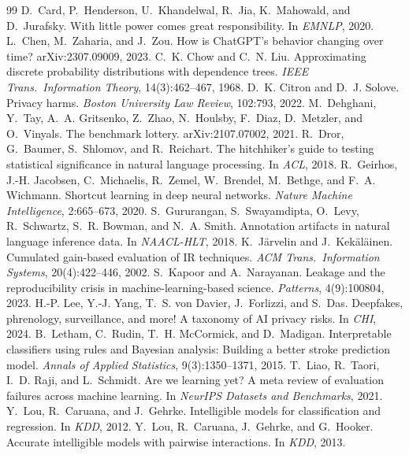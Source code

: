 \documentclass[10pt,twocolumn]{article}
\begin{document}
\begin{thebibliography}{99}\small
{} D.~Card, P.~Henderson, U.~Khandelwal, R.~Jia, K.~Mahowald, and D.~Jurafsky. With little power comes great responsibility. In \emph{EMNLP}, 2020.
 L.~Chen, M.~Zaharia, and J.~Zou. How is ChatGPT's behavior changing over time? arXiv:2307.09009, 2023.
 C.~K. Chow and C.~N. Liu. Approximating discrete probability distributions with dependence trees. \emph{IEEE Trans.\ Information Theory}, 14(3):462--467, 1968.
 D.~K. Citron and D.~J. Solove. Privacy harms. \emph{Boston University Law Review}, 102:793, 2022.
 M.~Dehghani, Y.~Tay, A.~A. Gritsenko, Z.~Zhao, N.~Houlsby, F.~Diaz, D.~Metzler, and O.~Vinyals. The benchmark lottery. arXiv:2107.07002, 2021.
 R.~Dror, G.~Baumer, S.~Shlomov, and R.~Reichart. The hitchhiker's guide to testing statistical significance in natural language processing. In \emph{ACL}, 2018.
 R.~Geirhos, J.-H. Jacobsen, C.~Michaelis, R.~Zemel, W.~Brendel, M.~Bethge, and F.~A. Wichmann. Shortcut learning in deep neural networks. \emph{Nature Machine Intelligence}, 2:665--673, 2020.
 S.~Gururangan, S.~Swayamdipta, O.~Levy, R.~Schwartz, S.~R. Bowman, and N.~A. Smith. Annotation artifacts in natural language inference data. In \emph{NAACL-HLT}, 2018.
 K.~J\"arvelin and J.~Kek\"al\"ainen. Cumulated gain-based evaluation of IR techniques. \emph{ACM Trans.\ Information Systems}, 20(4):422--446, 2002.
 S.~Kapoor and A.~Narayanan. Leakage and the reproducibility crisis in machine-learning-based science. \emph{Patterns}, 4(9):100804, 2023.
 H.-P. Lee, Y.-J. Yang, T.~S. von Davier, J.~Forlizzi, and S.~Das. Deepfakes, phrenology, surveillance, and more! A taxonomy of AI privacy risks. In \emph{CHI}, 2024.
 B.~Letham, C.~Rudin, T.~H. McCormick, and D.~Madigan. Interpretable classifiers using rules and Bayesian analysis: Building a better stroke prediction model. \emph{Annals of Applied Statistics}, 9(3):1350--1371, 2015.
 T.~Liao, R.~Taori, I.~D. Raji, and L.~Schmidt. Are we learning yet? A meta review of evaluation failures across machine learning. In \emph{NeurIPS Datasets and Benchmarks}, 2021.
 Y.~Lou, R.~Caruana, and J.~Gehrke. Intelligible models for classification and regression. In \emph{KDD}, 2012.
 Y.~Lou, R.~Caruana, J.~Gehrke, and G.~Hooker. Accurate intelligible models with pairwise interactions. In \emph{KDD}, 2013.

\end{thebibliography}
\end{document}
